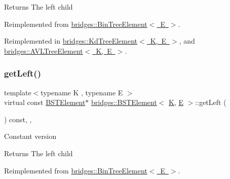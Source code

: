 \begin{DoxyReturn}{Returns}
The left child 
\end{DoxyReturn}


Reimplemented from \mbox{\hyperlink{classbridges_1_1_bin_tree_element_a8367ce9c4eea814637edc2c56efbde25}{bridges\+::\+Bin\+Tree\+Element$<$ E $>$}}.



Reimplemented in \mbox{\hyperlink{classbridges_1_1_kd_tree_element_ad7db63a4f82f5252c7e0809ac6486cb4}{bridges\+::\+Kd\+Tree\+Element$<$ K, E $>$}}, and \mbox{\hyperlink{classbridges_1_1_a_v_l_tree_element_a7b5d05660da127f5f6164120d9846d90}{bridges\+::\+A\+V\+L\+Tree\+Element$<$ K, E $>$}}.

\mbox{\label{classbridges_1_1_b_s_t_element_a2abcfb991f6cc377da2bd9217319fc9c}} 
\subsubsection{\texorpdfstring{getLeft()}{getLeft()}\hspace{0.1cm}{\footnotesize\ttfamily [2/2]}}
{\footnotesize\ttfamily template$<$typename K , typename E $>$ \\
virtual const \mbox{\hyperlink{classbridges_1_1_b_s_t_element}{B\+S\+T\+Element}}$\ast$ \mbox{\hyperlink{classbridges_1_1_b_s_t_element}{bridges\+::\+B\+S\+T\+Element}}$<$ \mbox{\hyperlink{namespacebridges_acfb0a4f7877d8f63de3e6862004c50edaa5f3c6a11b03839d46af9fb43c97c188}{K}}, \mbox{\hyperlink{namespacebridges_acfb0a4f7877d8f63de3e6862004c50eda3a3ea00cfc35332cedf6e5e9a32e94da}{E}} $>$\+::get\+Left (\begin{DoxyParamCaption}{ }\end{DoxyParamCaption}) const\hspace{0.3cm}{\ttfamily [inline]}, {\ttfamily [override]}, {\ttfamily [virtual]}}

Constant version

\begin{DoxyReturn}{Returns}
The left child 
\end{DoxyReturn}


Reimplemented from \mbox{\hyperlink{classbridges_1_1_bin_tree_element_a0841701bd7d4b444dafbbdfefed067a5}{bridges\+::\+Bin\+Tree\+Element$<$ E $>$}}.



